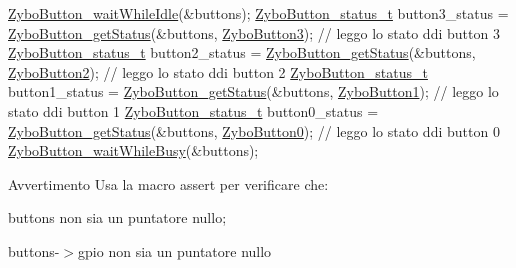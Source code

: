 \begin{DoxyCode}
\hyperlink{group___button_gaca30e81084e746785e395f79e9678e9a}{ZyboButton\_waitWhileIdle}(&buttons);
\hyperlink{group___button_ga85c290bfa232cab213e69200bf78e06a}{ZyboButton\_status\_t} button3\_status = \hyperlink{group___button_ga75407539e8ba0ad3ea142496219cd083}{ZyboButton\_getStatus}(&buttons, 
      \hyperlink{group___button_gga4d26a5f6cad606de534ba034e0ba42ddaabede392be8cae14b8a070a804c754e8}{ZyboButton3});               \textcolor{comment}{// leggo lo stato ddi button 3}
\hyperlink{group___button_ga85c290bfa232cab213e69200bf78e06a}{ZyboButton\_status\_t} button2\_status = \hyperlink{group___button_ga75407539e8ba0ad3ea142496219cd083}{ZyboButton\_getStatus}(&buttons, 
      \hyperlink{group___button_gga4d26a5f6cad606de534ba034e0ba42dda2aa888c8f01ac8a79013e5ebc9eef609}{ZyboButton2});               \textcolor{comment}{// leggo lo stato ddi button 2}
\hyperlink{group___button_ga85c290bfa232cab213e69200bf78e06a}{ZyboButton\_status\_t} button1\_status = \hyperlink{group___button_ga75407539e8ba0ad3ea142496219cd083}{ZyboButton\_getStatus}(&buttons, 
      \hyperlink{group___button_gga4d26a5f6cad606de534ba034e0ba42dda29c35ef3133898c050f675a60de66dd7}{ZyboButton1});               \textcolor{comment}{// leggo lo stato ddi button 1}
\hyperlink{group___button_ga85c290bfa232cab213e69200bf78e06a}{ZyboButton\_status\_t} button0\_status = \hyperlink{group___button_ga75407539e8ba0ad3ea142496219cd083}{ZyboButton\_getStatus}(&buttons, 
      \hyperlink{group___button_gga4d26a5f6cad606de534ba034e0ba42dda2f821ce9661687aefb0ec4de65911570}{ZyboButton0});               \textcolor{comment}{// leggo lo stato ddi button 0}
\hyperlink{group___button_ga3840edf011b5bad6302b7efc9c6326fe}{ZyboButton\_waitWhileBusy}(&buttons);
\end{DoxyCode}


\begin{DoxyWarning}{Avvertimento}
Usa la macro assert per verificare che\+:
\begin{DoxyItemize}
\item buttons non sia un puntatore nullo;
\item buttons-\/$>$gpio non sia un puntatore nullo 
\end{DoxyItemize}
\end{DoxyWarning}
\mbox{\label{group___button_gaca30e81084e746785e395f79e9678e9a}} 
